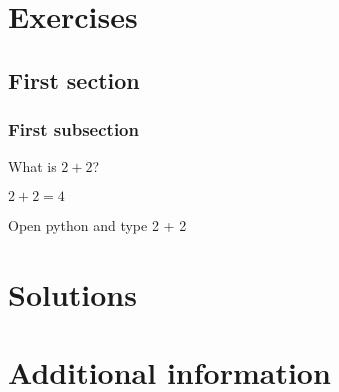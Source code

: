 \documentclass[oneside]{book}
\begin{document}
\chapter{Exercises}

\section{First section}

\subsection{First subsection}

\begin{exercise}[subtitle={Simple Addition}]
  What is \(2 + 2\)?
\end{exercise}

\begin{solution}
  \(2 + 2 = 4\)
\end{solution}

\begin{additionalinformation}
Open python and type 2 + 2
\end{additionalinformation}

\chapter{Solutions}

\chapter{Additional information}
\end{document}
